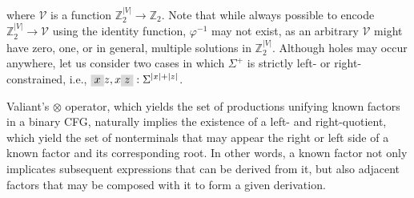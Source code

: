 \documentclass[sigplan,nonacm,anonymous]{acmart}\settopmatter{printfolios=false,printccs=false,printacmref=false}
\begin{document}
  \noindent where $\mathcal{V}$ is a function $\mathbb{Z}_2^{|V|}\rightarrow\mathbb{Z}_2$. Note that while always possible to encode $\mathbb{Z}_2^{|V|} \rightarrow \mathcal{V}$ using the identity function, $\varphi^{-1}$ may not exist, as an arbitrary $\mathcal{V}$ might have zero, one, or in general, multiple solutions in $\mathbb{Z}_2^{|V|}$. Although holes may occur anywhere, let us consider two cases in which $\Sigma^+$ is strictly left- or right-constrained, i.e., $\highlight{x}z, x\highlight{z}: \Sigma^{|x|+|z|}$.

  Valiant's $\otimes$ operator, which yields the set of productions unifying known factors in a binary CFG, naturally implies the existence of a left- and right-quotient, which yield the set of nonterminals that may appear the right or left side of a known factor and its corresponding root. In other words, a known factor not only implicates subsequent expressions that can be derived from it, but also adjacent factors that may be composed with it to form a given derivation.
\end{document}
